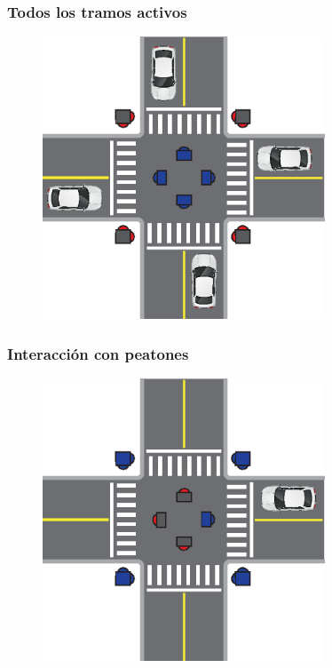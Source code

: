 \begin{frame}
\frametitle{Todos los tramos activos}
\begin{figure}[htbp]
	\centering
	\includegraphics[width=0.750\textwidth]{diagramas/todos-activos.eps}
\end{figure}
\end{frame}

\begin{frame}
\frametitle{Interacción con peatones}
\begin{figure}[htbp]
	\centering
	\includegraphics[width=0.750\textwidth]{diagramas/peaton-auto.eps}
\end{figure}
\end{frame}

